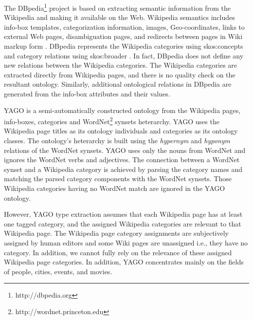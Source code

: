 The DBpedia\footnote{http://dbpedia.org} project is based on extracting 
semantic information from the Wikipedia and making it available on the Web. 
Wikipedia semantics includes info-box templates, categorization information, 
images, Geo-coordinates, links to external Web pages, disambiguation pages, 
and redirects between pages in Wiki markup form \cite{Bizer2009}. 
DBpedia represents the Wikipedia categories using skos:concepts and category 
relations using skos:broader \cite{Bizer2009}. In fact, 
DBpedia does not define any new relations between the Wikipedia categories. 
The Wikipedia categories are extracted directly from Wikipedia pages, and there 
is no quality check on the resultant ontology. Similarly, additional ontological 
relations in DBpedia are generated from the info-box attributes and their values.

YAGO is a semi-automatically constructed ontology from the Wikipedia pages, info-boxes, categories and WordNet\footnote{http://wordnet.princeton.edu} synsets heterarchy\cite{Suchanek2009phd}. YAGO uses the Wikipedia page titles as its ontology individuals and categories as its ontology classes. The ontology's heterarchy is built using the \textit{hypernym} and \textit{hyponym} relations of the WordNet synsets. YAGO uses only the nouns from WordNet and ignores the WordNet verbs and adjectives. The connection between a WordNet synset and a Wikipedia category is achieved by parsing the category names and matching the parsed category components with the WordNet synsets\cite{Suchanek2009phd}. Those Wikipedia categories having no WordNet match are ignored in the YAGO ontology.

However, YAGO type extraction assumes that each Wikipedia page has at least one tagged category, and the assigned Wikipedia categories are relevant to that Wikipedia page. The Wikipedia page category assignments are subjectively assigned by human editors and some Wiki pages are unassigned i.e., they have no category. In addition, we cannot fully rely on the relevance of these assigned Wikipedia page categories. In addition, YAGO concentrates mainly on the fields of people, cities, events, and movies\cite{Suchanek2009phd}.
